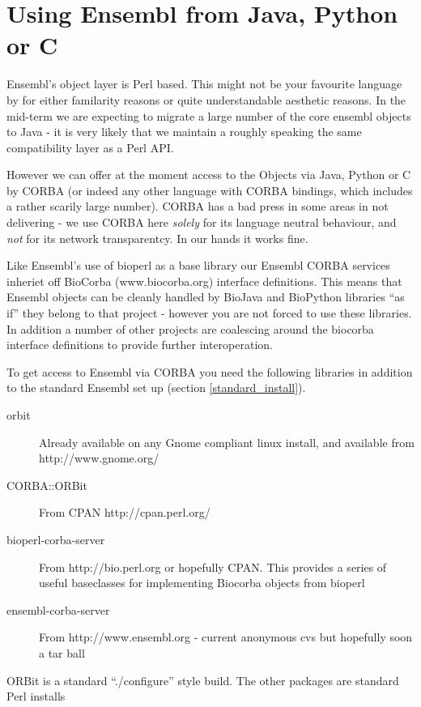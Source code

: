 \documentclass[11pt,a4paper]{article}
\begin{document}
\section{Using Ensembl from Java, Python or C}

\label{Ensembl_other_language}

Ensembl's object layer is Perl based. This might not be your favourite
language by for either familarity reasons or quite understandable
aesthetic reasons. In the mid-term we are expecting to migrate a large
number of the core ensembl objects to Java - it is very likely that we maintain
a roughly speaking the same compatibility layer as a Perl API.

However we can offer at the moment access to the Objects via Java,
Python or C by CORBA (or indeed any other language with CORBA
bindings, which includes a rather scarily large number). CORBA has a
bad press in some areas in not delivering - we use CORBA here
\emph{solely} for its language neutral behaviour, and \emph{not} for
its network transparentcy. In our hands it works fine.

Like Ensembl's use of bioperl as a base library our Ensembl CORBA
services inheriet off BioCorba (www.biocorba.org) interface
definitions.  This means that Ensembl objects can be cleanly handled
by BioJava and BioPython libraries ``as if'' they belong to that
project - however you are not forced to use these libraries. In
addition a number of other projects are coalescing around the biocorba
interface definitions to provide further interoperation.


To get access to Ensembl via CORBA you need the following libraries
in addition to the standard Ensembl set up (section \ref{standard_install}).

\begin{description}
\item[orbit] Already available on any Gnome compliant linux install, and
available from http://www.gnome.org/
\item[CORBA::ORBit] From CPAN http://cpan.perl.org/
\item[bioperl-corba-server] From http://bio.perl.org or hopefully CPAN.
This provides a series of useful baseclasses for implementing Biocorba
objects from bioperl
\item[ensembl-corba-server] From http://www.ensembl.org - current anonymous
cvs but hopefully soon a tar ball
\end{description}

ORBit is a standard ``./configure'' style build. The other packages are standard
Perl installs
\end{document}

